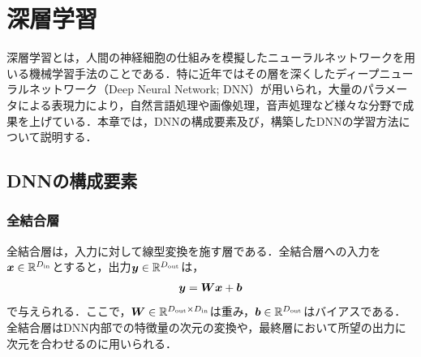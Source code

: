 \section{深層学習}
深層学習とは，人間の神経細胞の仕組みを模擬したニューラルネットワークを用いる機械学習手法のことである．特に近年ではその層を深くしたディープニューラルネットワーク（Deep Neural Network; DNN）が用いられ，大量のパラメータによる表現力により，自然言語処理や画像処理，音声処理など様々な分野で成果を上げている．本章では，DNNの構成要素及び，構築したDNNの学習方法について説明する．

\subsection{DNNの構成要素}
\subsubsection{全結合層}
全結合層は，入力に対して線型変換を施す層である．全結合層への入力を$\bm{x} \in \mathbb{R}^{D_{\text{in}}}$とすると，出力$\bm{y} \in \mathbb{R}^{D_{\text{out}}}$は，
\begin{align}
    \bm{y} = \bm{W}\bm{x} + \bm{b}
\end{align}
で与えられる．ここで，$\bm{W} \in \mathbb{R}^{D_{\text{out}} \times D_{\text{in}}}$は重み，$\bm{b} \in \mathbb{R}^{D_{\text{out}}}$はバイアスである．全結合層はDNN内部での特徴量の次元の変換や，最終層において所望の出力に次元を合わせるのに用いられる．

